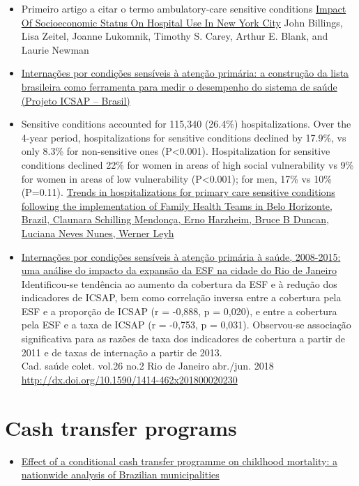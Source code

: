 \documentclass[]{book}
\providecommand{\tightlist}{%
  \setlength{\itemsep}{0pt}\setlength{\parskip}{0pt}}
\begin{document}
\begin{itemize}
\item
  Primeiro artigo a citar o termo ambulatory-care sensitive conditions \href{https://www.healthaffairs.org/doi/pdf/10.1377/hlthaff.12.1.162}{Impact Of Socioeconomic Status On Hospital Use In New York City} John Billings, Lisa Zeitel, Joanne Lukomnik, Timothy S. Carey, Arthur E. Blank, and Laurie Newman
\item
  \href{http://www.scielo.br/pdf/csp/v25n6/16.pdf}{Internações por condições sensíveis à atenção primária: a construção da lista brasileira como ferramenta para medir o desempenho do sistema de saúde (Projeto ICSAP -- Brasil)}
\item
  Sensitive conditions accounted for 115,340 (26.4\%) hospitalizations. Over the 4-year period, hospitalizations for sensitive conditions declined by 17.9\%, vs only 8.3\% for non-sensitive ones (P\textless{}0.001). Hospitalization for sensitive conditions declined 22\% for women in areas of high social vulnerability vs 9\% for women in areas of low vulnerability (P\textless{}0.001); for men, 17\% vs 10\% (P=0.11). \href{https://academic.oup.com/heapol/article/27/4/348/605470}{Trends in hospitalizations for primary care sensitive conditions following the implementation of Family Health Teams in Belo Horizonte, Brazil, Claunara Schilling Mendonça, Erno Harzheim, Bruce B Duncan, Luciana Neves Nunes, Werner Leyh}
\item
  \href{http://www.scielo.br/scielo.php?script=sci_arttext\&pid=S1414-462X2018000200178\&lng=pt\&nrm=iso\&tlng=pt}{Internações por condições sensíveis à atenção primária à saúde, 2008-2015: uma análise do impacto da expansão da ESF na cidade do Rio de Janeiro}\\
  Identificou-se tendência ao aumento da cobertura da ESF e à redução dos indicadores de ICSAP, bem como correlação inversa entre a cobertura pela ESF e a proporção de ICSAP (r = -0,888, p = 0,020), e entre a cobertura pela ESF e a taxa de ICSAP (r = -0,753, p = 0,031). Observou-se associação significativa para as razões de taxa dos indicadores de cobertura a partir de 2011 e de taxas de internação a partir de 2013.\\
  Cad. saúde colet. vol.26 no.2 Rio de Janeiro abr./jun. 2018 \url{http://dx.doi.org/10.1590/1414-462x201800020230}
\end{itemize}

\hypertarget{cash-transfer-programs}{%
\section*{Cash transfer programs}\label{cash-transfer-programs}}

\begin{itemize}
\tightlist
\item
  \href{https://sci-hub.tw/https://doi.org/10.1016/S0140-6736(13)60715-1}{Effect of a conditional cash transfer programme on childhood mortality: a nationwide analysis of Brazilian municipalities}
\end{itemize}


\end{document}
